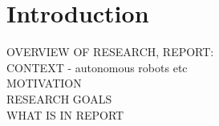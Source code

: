 \chapter{Introduction}
OVERVIEW OF RESEARCH, REPORT:\\
CONTEXT - autonomous robots etc\\
MOTIVATION\\
RESEARCH GOALS\\
WHAT IS IN REPORT\\


